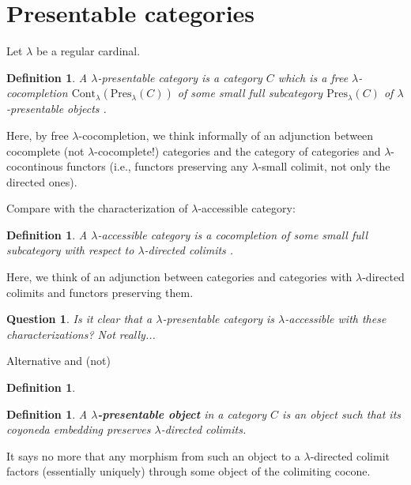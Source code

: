 \documentclass{article}
\newcommand{\CC}{\mathsf{C}}
\newcommand{\Cont}[1]{\text{Cont}_{#1}}
\newcommand{\Pres}[1]{\text{Pres}_{#1}}
\newcommand{\Set}{\text{Set}}
\newtheorem{definition}[theorem]{Definition}
\newtheorem{question}[theorem]{Question}
\begin{document}
  \section{Presentable categories}
  Let $\lambda$ be a regular cardinal.
  \begin{definition}
  A $\lambda$-presentable category is a
  category $C$ which is a free $\lambda$-cocompletion
  $\Cont\lambda(\Pres\lambda(C))$ of
  some small full subcategory $\Pres\lambda(C)$ of \emph{$\lambda$-presentable
    objects} \cite[Representation theorem 1.46]{adamek_rosicky}.
  \end{definition}

  Here, by free $\lambda$-cocompletion, we think informally of an adjunction between
  cocomplete (not $\lambda$-cocomplete!) categories and the category of
  categories and $\lambda$-cocontinous functors (i.e., functors preserving any
  $\lambda$-small colimit, not only the directed ones).

  Compare with the characterization of $\lambda$-accessible category:
  \begin{definition}
  A $\lambda$-accessible category is a cocompletion of some small full subcategory with respect to $\lambda$-directed colimits
  \cite[Representation theorem 2.26]{adamek_rosicky}. 
  \end{definition}
  Here, we think of an
  adjunction between categories and categories with $\lambda$-directed colimits
  and functors preserving them.
  \begin{question}
   Is it clear that a $\lambda$-presentable category is $\lambda$-accessible
   with these characterizations? Not really...
  \end{question}
  Alternative and (not)
  \begin{definition}
    
  \end{definition}

  \begin{definition}
    A \textbf{$\lambda$-presentable object} in a category $C$ is an object such
    that its coyoneda embedding preserves $\lambda$-directed colimits.
  \end{definition}
  It says no more that any morphism from such an object to a $\lambda$-directed
  colimit factors (essentially uniquely) through some object of the colimiting cocone.
\end{document}
